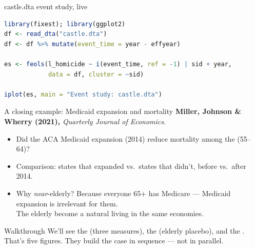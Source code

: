 \documentclass[aspectratio=169,11pt]{beamer}
\begin{document}
\begin{frame}[fragile]{castle.dta event study, live}
\vspace{0.3em}
\begin{lstlisting}[language=R]
library(fixest); library(ggplot2)
df <- read_dta("castle.dta")
df <- df %>% mutate(event_time = year - effyear)

es <- feols(l_homicide ~ i(event_time, ref = -1) | sid + year,
            data = df, cluster = ~sid)

iplot(es, main = "Event study: castle.dta")
\end{lstlisting}
\vspace{0.4em}
\end{frame}


\begin{frame}{A closing example: Medicaid expansion and mortality}
\vspace{0.4em}
\textbf{Miller, Johnson \& Wherry (2021),} \textit{Quarterly Journal of Economics}.
\vspace{0.5em}
\begin{itemize}
  \item Did the ACA Medicaid expansion (2014) reduce mortality among the  (55--64)?
  \item Comparison: states that expanded vs.\ states that didn't, before vs.\ after 2014.
  \item Why \textit{near}-elderly? Because everyone 65+ has Medicare --- Medicaid expansion is irrelevant for them. \\ The elderly become a natural  living in the same economies.
\end{itemize}
\vspace{0.5em}
\begin{block}{Walkthrough}
\small
We'll see the  (three measures), the  (elderly placebo), and the . That's five figures. They build the case in sequence --- not in parallel.
\end{block}
\end{frame}
\end{document}
